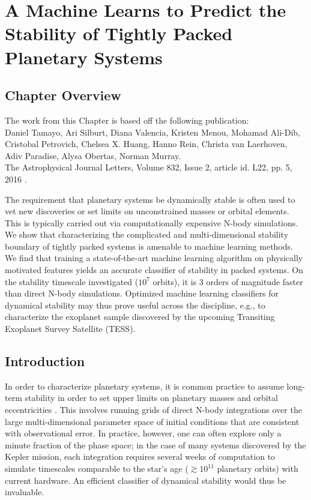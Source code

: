 \chapter[Stability of Planetary Systems]{A Machine Learns to Predict the Stability of Tightly Packed Planetary Systems}
\label{chap:Stability}

\section{Chapter Overview}
	\begin{center}
	\begin{minipage}[c]{4.75in}
	The work from this Chapter is based off the following publication:\\
	
	Daniel Tamayo, Ari Silburt, Diana Valencia, Kristen Menou, Mohamad Ali-Dib, Cristobal Petrovich, Chelsea X. Huang, Hanno Rein, Christa van Laerhoven, Adiv Paradise, Alysa Obertas, Norman Murray.\\
	The Astrophysical Journal Letters, Volume 832, Issue 2, article id. L22, pp. 5, 2016 \citep{Tamayo2016}.
	\vspace{2em}
	\end{minipage}
	\end{center}
	
The requirement that planetary systems be dynamically stable is often used to vet new discoveries or set limits on unconstrained masses or orbital elements. 
This is typically carried out via computationally expensive N-body simulations.
We show that characterizing the complicated and multi-dimensional stability boundary of tightly packed systems is amenable to machine learning methods. 
We find that training a state-of-the-art machine learning algorithm on physically motivated features yields an accurate classifier of stability in packed systems. 
On the stability timescale investigated ($10^7$ orbits), it is 3 orders of magnitude faster than direct N-body simulations. 
Optimized machine learning classifiers for dynamical stability may thus prove useful across the discipline, e.g., to characterize the exoplanet sample discovered by the upcoming Transiting Exoplanet Survey Satellite (TESS).

\section{Introduction}
In order to characterize planetary systems, it is common practice to assume long-term stability in order to set upper limits on planetary masses and orbital eccentricities \citep[e.g.][]{Lissauer2011, Steffen2013, Tamayo14b, Tamayo2015}.
This involves running grids of direct N-body integrations over the large multi-dimensional parameter space of initial conditions that are consistent with observational error.
In practice, however, one can often explore only a minute fraction of the phase space; in the case of many systems discovered by the Kepler mission, each integration requires several weeks of computation to simulate timescales comparable to the star's age ($\gtrsim 10^{11}$ planetary orbits) with current hardware.
An efficient classifier of dynamical stability would thus be invaluable.

